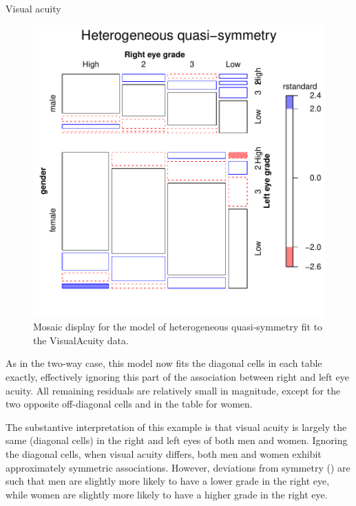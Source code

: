 \documentclass[11pt]{book}\usepackage[]{graphicx}\usepackage[]{color}
\newenvironment{knitrout}{}{} %
\renewenvironment{knitrout}{\small\renewcommand{\baselinestretch}{.85}}{} %
\begin{document}
\begin{Example}{Visual acuity}
\begin{knitrout}
\begin{figure}[!htbp]
\centerline{\includegraphics[width=.7\textwidth]{ch08/fig/vision2-hetqsymm-1} }

\caption[Mosaic display for the model of heterogeneous quasi-symmetry fit to the VisualAcuity data]{Mosaic display for the model of heterogeneous quasi-symmetry fit to the VisualAcuity data.\label{fig:vision2-hetqsymm}}
\end{figure}


\end{knitrout}
As in the two-way case, this model now fits the diagonal cells in each table exactly,
effectively ignoring this part of the association between right and left eye
acuity. All remaining residuals are relatively small in magnitude, except for the
two opposite off-diagonal cells  and  in the
table for women.

The substantive interpretation of this example is that
visual acuity is largely the same (diagonal cells)
in the right and left eyes of both men and women.  Ignoring the diagonal cells,
when visual acuity differs, both men and women exhibit approximately symmetric
associations.  However, deviations from symmetry ()
are such that men are slightly more likely to have a lower grade in the right eye,
while women are slightly more likely to have a higher grade in the right eye.



\end{Example}

\end{document}
